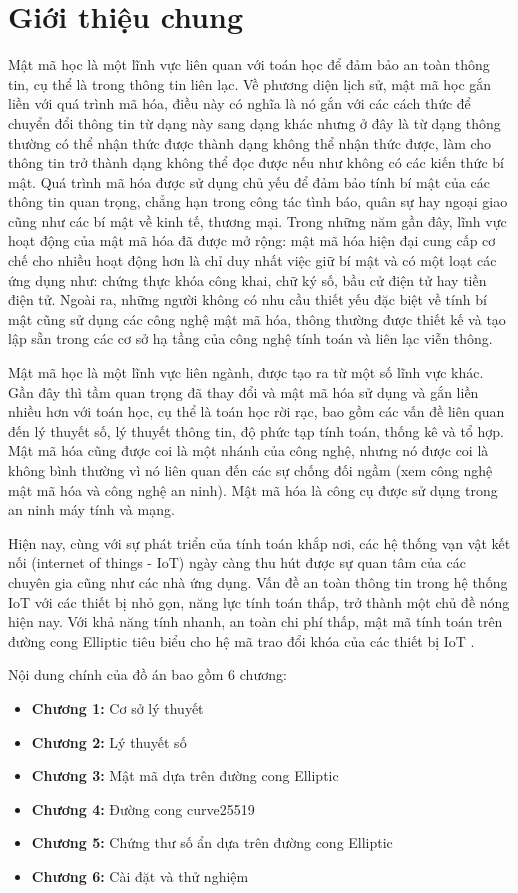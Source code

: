 \documentclass[a4paper,12pt]{report}
\begin{document}
\chapter*{Giới thiệu chung}
Mật mã học là một lĩnh vực liên quan với toán học để đảm bảo an toàn thông tin, cụ thể là trong thông tin liên lạc. Về phương diện lịch sử, mật mã học gắn liền với quá trình mã hóa, điều này có nghĩa là nó gắn với các cách thức để chuyển đổi thông tin từ dạng này sang dạng khác nhưng ở đây là từ dạng thông thường có thể nhận thức được thành dạng không thể nhận thức được, làm cho thông tin trở thành dạng không thể đọc được nếu như không có các kiến thức bí mật. Quá trình mã hóa được sử dụng chủ yếu để đảm bảo tính bí mật của các thông tin quan trọng, chẳng hạn trong công tác tình báo, quân sự hay ngoại giao cũng như các bí mật về kinh tế, thương mại.  Trong những năm gần đây, lĩnh vực hoạt động của mật mã hóa đã được mở rộng: mật mã hóa hiện đại cung cấp cơ chế cho nhiều hoạt động hơn là chỉ duy nhất việc giữ bí mật và có một loạt các ứng dụng như: chứng thực khóa công khai, chữ ký số, bầu cử điện tử hay tiền điện tử. Ngoài ra, những người không có nhu cầu thiết yếu đặc biệt về tính bí mật cũng sử dụng các công nghệ mật mã hóa, thông thường được thiết kế và tạo lập sẵn trong các cơ sở hạ tầng của công nghệ tính toán và liên lạc viễn thông. 

Mật mã học là một lĩnh vực liên ngành, được tạo ra từ một số lĩnh vực khác. Gần đây thì tầm quan trọng đã thay đổi và mật mã hóa sử dụng và gắn liền nhiều hơn với toán học, cụ thể là toán học rời rạc, bao gồm các vấn đề liên quan đến lý thuyết số, lý thuyết thông tin, độ phức tạp tính toán, thống kê và tổ hợp. Mật mã hóa cũng được coi là một nhánh của công nghệ, nhưng nó được coi là không bình thường vì nó liên quan đến các sự chống đối ngầm (xem công nghệ mật mã hóa và công nghệ an ninh). Mật mã hóa là công cụ được sử dụng trong an ninh máy tính và mạng. 

Hiện nay, cùng với sự phát triển của tính toán khắp nơi, các hệ thống vạn vật kết nối (internet of things - IoT) ngày càng thu hút được sự quan tâm của các chuyên gia cũng như các nhà ứng dụng. Vấn đề an toàn thông tin trong hệ thống IoT với các thiết bị nhỏ gọn, năng lực tính toán thấp, trở thành một chủ đề nóng hiện nay. Với khả năng tính nhanh, an toàn chi phí thấp, mật mã tính toán trên đường cong Elliptic  tiêu biểu cho hệ mã trao đổi khóa của các thiết bị IoT .

Nội dung chính của đồ án bao gồm 6 chương:
\begin{itemize}
\item \textbf{Chương 1:} Cơ sở lý thuyết
\item \textbf{Chương 2:} Lý thuyết số
\item \textbf{Chương 3:} Mật mã dựa trên đường cong Elliptic
\item \textbf{Chương 4:} Đường cong curve25519
\item \textbf{Chương 5:} Chứng thư số ẩn dựa trên đường cong Elliptic
\item \textbf{Chương 6:} Cài đặt và thử nghiệm
\end{itemize}
\end{document}
